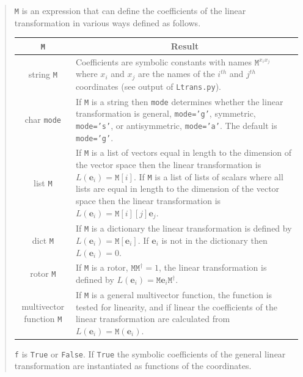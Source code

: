 \documentclass[12pt]{report}
\newcommand{\bm}[1]{\boldsymbol{#1}}
\newcommand{\ebf}{\bm{e}}
\newcommand{\mat}[1]{\left [ {#1} \right ]}
\newcommand{\lp}{\left (}
\newcommand{\rp}{\right )}
\newcommand{\R}{\dagger}
\newcommand{\f}[2]{{#1}\lp {#2} \rp}
\newcommand{\T}[1]{\texttt{#1}}
\begin{document}
\begin{quote}
    \T{M} is an expression that can define the coefficients of the linear transformation in various ways defined as follows.
    \begin{center}
    \begin{longtable}{cl}
    \T{M} &  \multicolumn{1}{c}{Result} \\ \hline
    string \T{M} & \parbox[t]{4in}{Coefficients are symbolic constants with names $\T{M}^{x_{i}x_{j}}$ where $x_{i}$
                       and $x_{j}$ are the names
    of the $i^{th}$ and $j^{th}$ coordinates (see output of \T{Ltrans.py}). } \\ \hline
    char \T{mode} &  \parbox[t]{4in}{If \T{M} is a string then \T{mode} determines whether the linear transformation is 
                    general, \T{mode='g'}, symmetric, \T{mode='s'}, or antisymmetric, \T{mode='a'}.  The default is 
                    \T{mode='g'}.}\\ \hline
    list \T{M} & \parbox[t]{4in}{If \T{M} is a list of vectors equal in length to the dimension of the vector space then
                 the linear transformation is $\f{L}{\ebf_{i}} = \T{M}\mat{i}$. If \T{M} is a list of lists of scalars where all
                 lists are equal in length to the dimension of the vector space then the linear transformation is
                 $\f{L}{\ebf_{i}} = \T{M}\mat{i}\mat{j}\ebf_{j}$.} \\ \hline
    dict \T{M} & \parbox[t]{4in}{If \T{M} is a dictionary the linear transformation is defined by
                 $\f{L}{\ebf_{i}} = \T{M}\mat{\ebf_{i}}$. If $\ebf_{i}$ is not in the dictionary then $\f{L}{\ebf_{i}} =0$.} \\ \hline
    rotor \T{M} & \parbox[t]{4in}{If \T{M} is a rotor, $\T{M}\T{M}^{\R}=1$, the linear transformation is defined by
                   $\f{L}{\ebf_{i}} = \T{M}\ebf_{i}\T{M}^{\R}$.} \\ \hline
    multivector function \T{M} & \parbox[t]{4in}{If \T{M} is a general multivector function, the function is tested for linearity, and if
                                 linear the coefficients of the linear transformation are calculated from
                                 $\f{L}{\ebf_{i}} = \f{\T{M}}{\ebf_{i}}$.} \\ \hline
    \end{longtable}
    \end{center}
    \vspace{-0.5in}\T{f} is \T{True} or \T{False}. If \T{True} the symbolic coefficients of the general linear transformation are instantiated as functions of the coordinates.
\end{quote}
\end{document}
